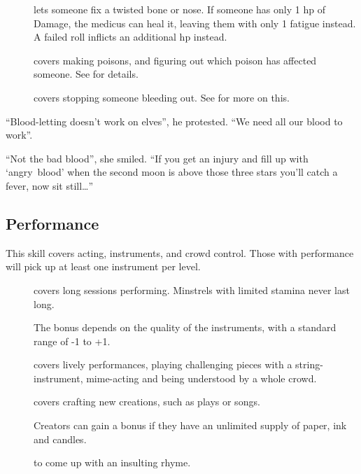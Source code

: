 \begin{multicols}{2}
\begin{description}
  \item[]
    lets someone fix a twisted bone or nose.
    If someone has only 1 \gls{hp} of Damage, the medicus can heal it, leaving them with only 1 \gls{fatigue} instead.
    A failed roll inflicts an additional \gls{hp} instead.
  \item[]
    covers making poisons, and figuring out which poison has affected someone.
    See  for details.
  \item[]
    covers stopping someone bleeding out.
    See  for more on this.
\end{description}

\begin{exampletext}
  ``Blood-letting doesn't work on elves'', he protested.
  ``We need all our blood to work''.

  ``Not the bad blood'', she smiled.
  ``If you get an injury and fill up with `angry~blood' when the second moon is above those three stars you'll catch a fever, now sit still\ldots''
\end{exampletext}

\subsection{Performance}

This skill covers acting, instruments, and crowd control.
Those with performance will pick up at least one instrument per level.

\begin{description}
  \item[]
    covers long sessions performing.
    Minstrels with limited stamina never last long.

    The bonus depends on the quality of the instruments, with a standard range of -1 to +1.
  \item[]
    covers lively performances, playing challenging pieces with a string-instrument, mime-acting and being understood by a whole crowd.
  \item[]
    covers crafting new creations, such as plays or songs.

    Creators can gain a bonus if they have an unlimited supply of paper, ink and candles.
  \item[]
    to come up with an insulting rhyme.
\end{description}


\end{multicols}
